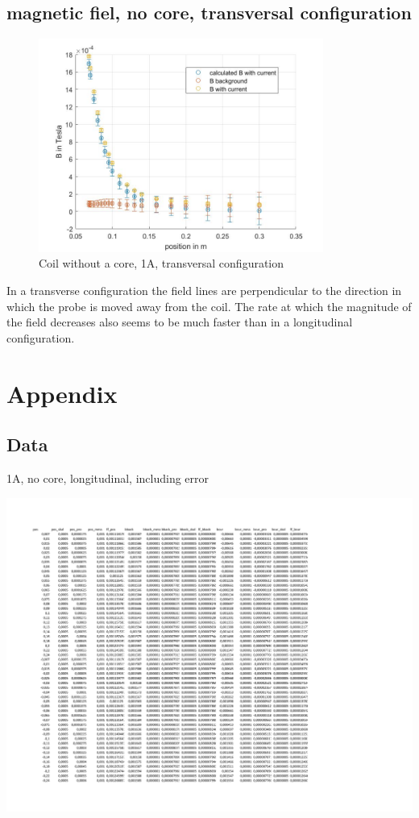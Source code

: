 \documentclass[12pt]{article}
\begin{document}
	\subsection{magnetic fiel, no core, transversal configuration}
	\begin{figure}[H]
	\centering
	\includegraphics[height=7cm]{trans 1A mit kern nur Punkte.jpg}
	\caption{Coil without a core, 1A, transversal configuration}
	\end{figure}

	In a transverse configuration the field lines are perpendicular to the direction in which the probe is moved away from the coil. The rate at which the magnitude of the field decreases also seems to be much faster than in a longitudinal configuration. 
	
	\section{Appendix}\label{sec:anh}
		\vspace{2cm}
	\subsection{Data}
	\begin{table}[H] 
		\caption{1A, no core, longitudinal, including error}
		\includegraphics[width=20cm]{Daten.xlsx - 1A ohne Kern longitudinal.pdf}
	\end{table}
\end{document}

